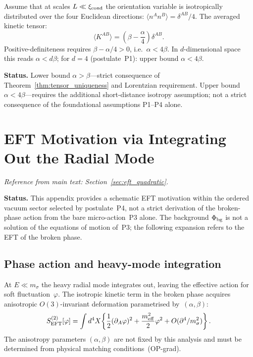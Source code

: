 \documentclass[11pt,a4paper]{article}
\numberwithin{equation}{section}
\begin{document}
Assume that at scales $L\ll\xi_{\rm cond}$ the orientation variable
is isotropically distributed over the four Euclidean directions:
$\langle n^A n^B\rangle = \delta^{AB}/4$.
The averaged kinetic tensor:
\[
  \langle K^{AB}\rangle = \left(\beta-\frac{\alpha}{4}\right)\delta^{AB}.
\]
Positive-definiteness requires $\beta-\alpha/4>0$, i.e.\ $\alpha<4\beta$.
In $d$-dimensional space this reads $\alpha<d\beta$; for $d=4$ (postulate~P1):
upper bound $\alpha<4\beta$.

\noindent\textbf{Status.}
Lower bound $\alpha>\beta$---strict consequence of
Theorem~\ref{thm:tensor_uniqueness} and Lorentzian requirement.
Upper bound $\alpha<4\beta$---requires the additional short-distance isotropy
assumption; not a strict consequence of the foundational assumptions
P1--P4 alone.

\section{EFT Motivation via Integrating Out the Radial Mode}
\label{app:eft_derivation}

\textit{Reference from main text: Section~\ref{sec:eft_quadratic}.}

\noindent\textbf{Status.}
This appendix provides a schematic EFT motivation within the ordered
vacuum sector selected by postulate~P4, not a strict derivation of
the broken-phase action from the bare micro-action~P3 alone.
The background $\Phi_{\rm bg}$ is not a solution of the equations
of motion of~P3; the following expansion refers to the EFT of the
broken phase.

\subsection*{Phase action and heavy-mode integration}

At $E\ll m_\sigma$ the heavy radial mode integrates out,
leaving the effective action for soft fluctuation~$\varphi$.
The isotropic kinetic term in the broken phase acquires anisotropic
$O(3)$-invariant deformation parametrised by~$(\alpha,\beta)$:
\[
  S_{\rm EFT}^{(2)}[\varphi]
  = \int d^4X\!\left\{
    \frac{1}{2}(\partial_A\varphi)^2 + \frac{m_{\rm eff}^2}{2}\varphi^2
    + O(\partial^4/m_\sigma^2)
  \right\}.
\]
The anisotropy parameters $(\alpha,\beta)$ are not fixed by this analysis
and must be determined from physical matching conditions~(OP-grad).

\end{document}

